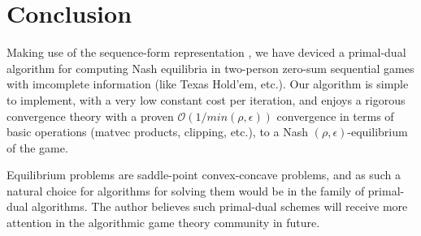 \documentclass{article} %
\begin{document}
\section{Conclusion}
Making use of the sequence-form representation
\cite{koller1992complexity,von1996efficient,vonequilibrium}, we have
deviced a primal-dual algorithm for computing Nash equilibria in
two-person zero-sum sequential games with imcomplete information (like
Texas Hold'em, etc.). Our algorithm is simple to implement, with a
very low constant cost per iteration, and enjoys a rigorous
convergence theory with a proven $\mathcal{O}(1/min(\rho,\epsilon))$ convergence
in terms of basic operations (matvec products, clipping, etc.), to a
Nash $(\rho,\epsilon)$-equilibrium of the game.

Equilibrium problems are saddle-point convex-concave problems, and as
such a natural choice for algorithms for solving them would be in the
family of primal-dual algorithms. The author believes such primal-dual
schemes will receive more attention in the algorithmic game theory
community in future.


\medskip \noindent

\small


\end{document}
